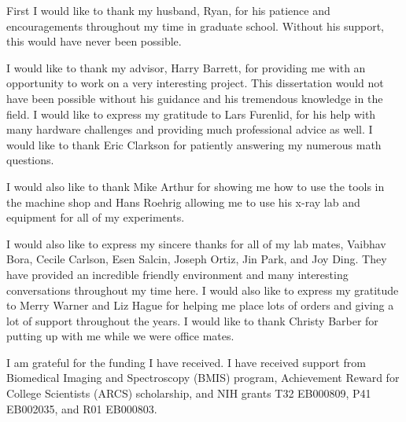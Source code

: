 First I would like to thank my husband, Ryan, for his patience and encouragements throughout my time in graduate school.  Without his support, this would have never been possible.

I would like to thank my advisor, Harry Barrett, for providing me with an opportunity to work on a very interesting project.  This dissertation would not have been possible without his guidance and his tremendous knowledge in the field.  I would like to express my gratitude to Lars Furenlid, for his help with many hardware challenges and providing much professional advice as well.  I would like to thank Eric Clarkson for patiently answering my numerous math questions.

I would also like to thank Mike Arthur for showing me how to use the tools in the machine shop and Hans Roehrig allowing me to use his x-ray lab and equipment for all of my experiments.

I would also like to express my sincere thanks for all of my lab mates, Vaibhav Bora, Cecile Carlson, Esen Salcin, Joseph Ortiz, Jin Park, and Joy Ding.  They have provided an incredible friendly environment and many interesting conversations throughout my time here.  I would also like to express my gratitude to Merry Warner and Liz Hague for helping me place lots of orders and giving a lot of support throughout the years.  I would like to thank Christy Barber for putting up with me while we were office mates.

I am grateful for the funding I have received.  I have received support from Biomedical Imaging and Spectroscopy (BMIS) program, Achievement Reward for College Scientists (ARCS) scholarship, and NIH grants T32 EB000809, P41 EB002035, and R01 EB000803.